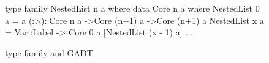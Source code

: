 \begin{figure}
    \begin{smallhskcode}
type family NestedList n a where   data Core n a where
  NestedList 0 a = a                 (:>)::Core n a ->Core (n+1) a ->Core (n+1) a
  NestedList x a =                   Var::Label -> Core 0 a
        [NestedList (x - 1) a]       ...
    \end{smallhskcode}
    \caption{ type family and  GADT}
    \label{fig:nestedlist}
\end{figure}